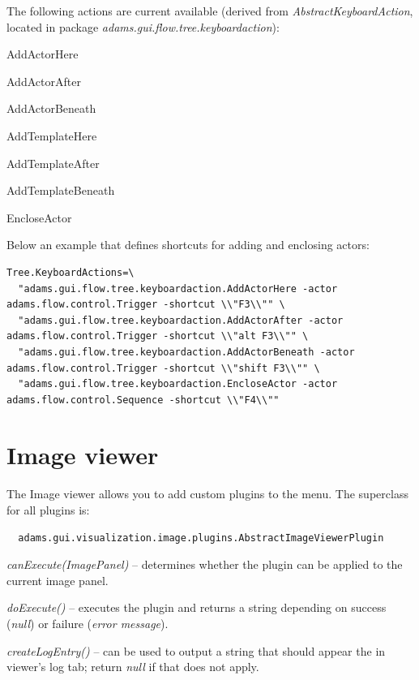 The following actions are current available (derived from \textit{AbstractKeyboardAction},
located in package \textit{adams.gui.flow.tree.keyboardaction}):
\begin{tight_itemize}
  \item AddActorHere
  \item AddActorAfter
  \item AddActorBeneath
  \item AddTemplateHere
  \item AddTemplateAfter
  \item AddTemplateBeneath
  \item EncloseActor
\end{tight_itemize}
Below an example that defines shortcuts for adding and enclosing actors:
{\scriptsize
\begin{verbatim}
Tree.KeyboardActions=\
  "adams.gui.flow.tree.keyboardaction.AddActorHere -actor adams.flow.control.Trigger -shortcut \\"F3\\"" \
  "adams.gui.flow.tree.keyboardaction.AddActorAfter -actor adams.flow.control.Trigger -shortcut \\"alt F3\\"" \
  "adams.gui.flow.tree.keyboardaction.AddActorBeneath -actor adams.flow.control.Trigger -shortcut \\"shift F3\\"" \
  "adams.gui.flow.tree.keyboardaction.EncloseActor -actor adams.flow.control.Sequence -shortcut \\"F4\\""
\end{verbatim}
}

\section{Image viewer}
The Image viewer allows you to add custom plugins to the menu. The superclass
for all plugins is:
\begin{verbatim}
  adams.gui.visualization.image.plugins.AbstractImageViewerPlugin
\end{verbatim}
\begin{tight_itemize}
  \item \textit{canExecute(ImagePanel)} -- determines whether the plugin can
  be applied to the current image panel.
  \item \textit{doExecute()} -- executes the plugin and returns a string
  depending on success (\textit{null}) or failure (\textit{error message}).
  \item \textit{createLogEntry()} -- can be used to output a string that 
  should appear the in viewer's log tab; return \textit{null} if that does
  not apply.
\end{tight_itemize}

